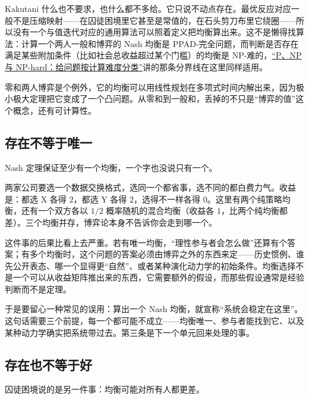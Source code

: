 Kakutani 什么也不要求，也什么都不多给。它只说不动点存在。最优反应对应一般不是压缩映射——在囚徒困境里它甚至是常值的，在石头剪刀布里它绕圈——所以没有一个与值迭代对应的通用算法可以照着定义把均衡算出来。这不是懒得找算法：计算一个两人一般和博弈的 Nash 均衡是 PPAD-完全问题，而判断是否存在满足某些附加条件（比如社会总收益超过某个门槛）的均衡是 NP-难的，\hyperref[sec:09-Convex-Optimization/09-Complexity-and-Approximation/01]{``P、NP 与 NP-hard：给问题按计算难度分类''}讲的那条分界线在这里同样适用。

零和两人博弈是个例外，它的均衡可以用线性规划在多项式时间内解出来，因为极小极大定理把它变成了一个凸问题。从零和到一般和，丢掉的不只是``博弈的值''这个概念，还有可计算性。

\subsection{存在不等于唯一}

Nash 定理保证至少有一个均衡，一个字也没说只有一个。

两家公司要选一个数据交换格式，选同一个都省事，选不同的都白费力气。收益是：都选 X 各得 \(2\)，都选 Y 各得 \(2\)，选得不一样各得 \(0\)。这里有两个纯策略均衡，还有一个双方各以 \(1/2\) 概率随机的混合均衡（收益各 \(1\)，比两个纯均衡都差）。三个均衡并存，博弈论本身不告诉你会走到哪一个。

这件事的后果比看上去严重。若有唯一均衡，``理性参与者会怎么做''还算有个答案；有多个均衡时，这个问题的答案必须由博弈之外的东西来定——历史惯例、谁先公开表态、哪一个显得更``自然''、或者某种演化动力学的初始条件。均衡选择不是一个可以从收益矩阵推出来的东西，它需要额外的假设，而那些假设通常是经验判断而不是定理。

于是要留心一种常见的误用：算出一个 Nash 均衡，就宣称``系统会稳定在这里''。这句话需要三个前提，每一个都可能不成立——均衡唯一、参与者能找到它、以及某种动力学确实把系统带过去。第三条是下一个单元回来处理的事。

\subsection{存在也不等于好}

囚徒困境说的是另一件事：均衡可能对所有人都更差。

